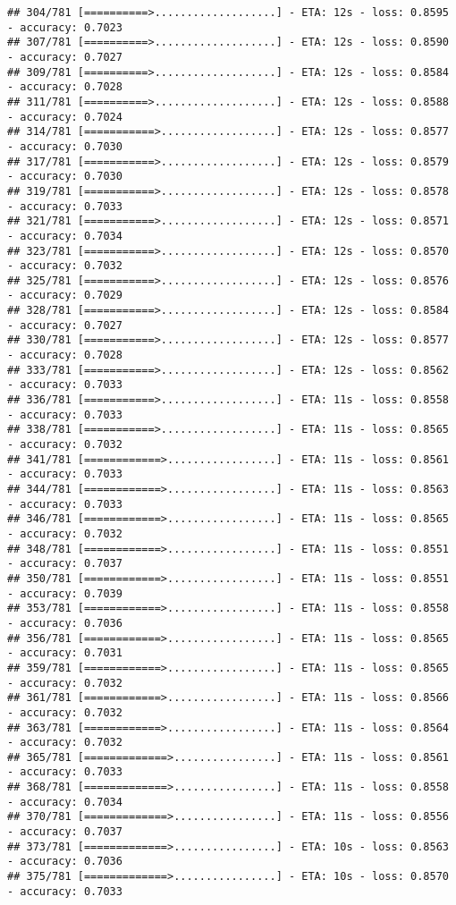 \documentclass[
]{article}
\begin{document}
\begin{verbatim}
## 304/781 [==========>...................] - ETA: 12s - loss: 0.8595 - accuracy: 0.7023
## 307/781 [==========>...................] - ETA: 12s - loss: 0.8590 - accuracy: 0.7027
## 309/781 [==========>...................] - ETA: 12s - loss: 0.8584 - accuracy: 0.7028
## 311/781 [==========>...................] - ETA: 12s - loss: 0.8588 - accuracy: 0.7024
## 314/781 [===========>..................] - ETA: 12s - loss: 0.8577 - accuracy: 0.7030
## 317/781 [===========>..................] - ETA: 12s - loss: 0.8579 - accuracy: 0.7030
## 319/781 [===========>..................] - ETA: 12s - loss: 0.8578 - accuracy: 0.7033
## 321/781 [===========>..................] - ETA: 12s - loss: 0.8571 - accuracy: 0.7034
## 323/781 [===========>..................] - ETA: 12s - loss: 0.8570 - accuracy: 0.7032
## 325/781 [===========>..................] - ETA: 12s - loss: 0.8576 - accuracy: 0.7029
## 328/781 [===========>..................] - ETA: 12s - loss: 0.8584 - accuracy: 0.7027
## 330/781 [===========>..................] - ETA: 12s - loss: 0.8577 - accuracy: 0.7028
## 333/781 [===========>..................] - ETA: 12s - loss: 0.8562 - accuracy: 0.7033
## 336/781 [===========>..................] - ETA: 11s - loss: 0.8558 - accuracy: 0.7033
## 338/781 [===========>..................] - ETA: 11s - loss: 0.8565 - accuracy: 0.7032
## 341/781 [============>.................] - ETA: 11s - loss: 0.8561 - accuracy: 0.7033
## 344/781 [============>.................] - ETA: 11s - loss: 0.8563 - accuracy: 0.7033
## 346/781 [============>.................] - ETA: 11s - loss: 0.8565 - accuracy: 0.7032
## 348/781 [============>.................] - ETA: 11s - loss: 0.8551 - accuracy: 0.7037
## 350/781 [============>.................] - ETA: 11s - loss: 0.8551 - accuracy: 0.7039
## 353/781 [============>.................] - ETA: 11s - loss: 0.8558 - accuracy: 0.7036
## 356/781 [============>.................] - ETA: 11s - loss: 0.8565 - accuracy: 0.7031
## 359/781 [============>.................] - ETA: 11s - loss: 0.8565 - accuracy: 0.7032
## 361/781 [============>.................] - ETA: 11s - loss: 0.8566 - accuracy: 0.7032
## 363/781 [============>.................] - ETA: 11s - loss: 0.8564 - accuracy: 0.7032
## 365/781 [=============>................] - ETA: 11s - loss: 0.8561 - accuracy: 0.7033
## 368/781 [=============>................] - ETA: 11s - loss: 0.8558 - accuracy: 0.7034
## 370/781 [=============>................] - ETA: 11s - loss: 0.8556 - accuracy: 0.7037
## 373/781 [=============>................] - ETA: 10s - loss: 0.8563 - accuracy: 0.7036
## 375/781 [=============>................] - ETA: 10s - loss: 0.8570 - accuracy: 0.7033

\end{verbatim}
\end{document}
